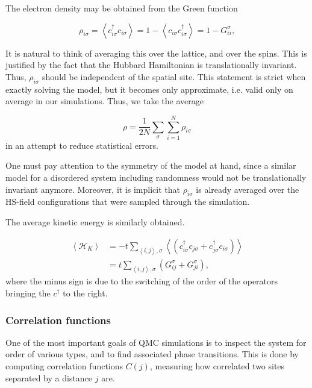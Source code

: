 The electron density may be obtained from the Green function

\begin{equation}
\rho_{i\sigma} = \left\langle c_{i\sigma}^\dagger c_{i\sigma} \right\rangle = 1 - \left\langle c_{i\sigma} c_{i\sigma}^\dagger \right\rangle = 1 - G_{ii}^\sigma ,
\end{equation}

It is natural to think of averaging this over the lattice, and over the spins. This is justified by the fact that the Hubbard Hamiltonian is translationally invariant. Thus, $\rho_{i\sigma}$ should be independent of the spatial site. This statement is strict when exactly solving the model, but it becomes only approximate, i.e. valid only on average in our simulations. Thus, we take the average

\begin{equation}
\rho = \frac{1}{2N} \sum_\sigma \sum_{i=1}^N \rho_{i\sigma}
\end{equation}
in an attempt to reduce statistical errors.

One must pay attention to the symmetry of the model at hand, since a similar model for a disordered system including randomness would not be translationally invariant anymore. Moreover, it is implicit that $\rho_{i\sigma}$ is already averaged over the HS-field configurations that were sampled through the simulation.

The average kinetic energy is similarly obtained.

\begin{equation}
\begin{split}
\left\langle \mathcal{H}_K \right\rangle &= - t  \sum_{\left\langle i, j \right\rangle , \sigma} \left\langle ( c_{i\sigma}^\dagger c_{j\sigma} + c_{j\sigma}^\dagger c_{i\sigma} ) \right\rangle \\
&= t \sum_{\left\langle i, j \right\rangle , \sigma} ( G_{ij}^\sigma + G_{ji}^\sigma ) ,
\end{split}
\end{equation}
where the minus sign is due to the switching of the order of the operators bringing the $c^\dagger$ to the right.

\subsubsection{Correlation functions}

One of the most important goals of QMC simulations is to inspect the system for order of various types, and to find  associated phase transitions. This is done by computing correlation functions $C (j) $, measuring how correlated two sites separated by a distance $j$ are.

